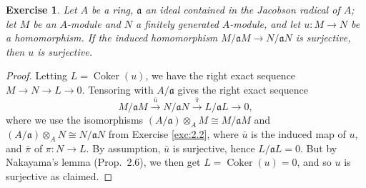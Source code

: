 \documentclass[12pt,letterpaper]{article}
\newtheorem{problem}{Exercise}[section]
\theoremstyle{definition}
\theoremstyle{remark}
\numberwithin{figure}{problem}
\numberwithin{equation}{section}
\DeclareMathOperator{\Coker}{Coker}
\begin{document}
\begin{problem}
  Let
  $A$ be a ring,
  $\mathfrak{a}$ an ideal contained in the Jacobson radical of
  $A$; let
  $M$ be an
  $A$-module and
  $N$ a finitely generated
  $A$-module, and let
  $u\colon M \to
  N$ be a homomorphism.
  If the induced homomorphism
  $M/\mathfrak{a}M \to
  N/\mathfrak{a}N$ is surjective, then
  $u$ is surjective.
\end{problem}
\begin{proof}
  Letting
  $L =
  \Coker(u)$, we have the right exact sequence
  $M \to N \to L \to
  0$.
  Tensoring with
  $A/\mathfrak{a}$ gives the right exact sequence
  \begin{equation*}
    M/\mathfrak{a}M \overset{\bar{u}}{\longrightarrow} N/\mathfrak{a}N \overset{\bar{\pi}}{\longrightarrow} L/\mathfrak{a}L \longrightarrow 0,
  \end{equation*}
  where we use the isomorphisms
  $(A/\mathfrak{a}) \otimes_A M \cong
  M/\mathfrak{a}M$ and
  $(A/\mathfrak{a}) \otimes_A N \cong
  N/\mathfrak{a}N$ from Exercise \ref{exc:2.2}, where
  $\bar{u}$ is the induced map of
  $u$, and
  $\bar{\pi}$ of
  $\pi\colon N \to
  L$.
  By assumption,
  $\bar{u}$ is surjective, hence
  $L/\mathfrak{a}L =
  0$.
  But by Nakayama's lemma (Prop.~2.6), we then get
  $L= \Coker(u) =
  0$, and so
  $u$ is surjective as claimed.
\end{proof}
\end{document}
